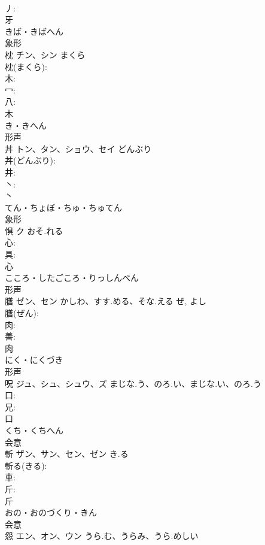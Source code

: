 \documentclass[8pt]{extreport}
\begin{document}
\begin{CJK}{UTF8}{min}
\\	丿: 
\\	牙	
\\	きば・きばへん	
\\	象形 
\\	枕	チン、シン	まくら		
\\	枕(まくら): 
\\	木: 
\\	冖: 
\\	八: 
\\	木	
\\	き・きへん	
\\	形声 
\\	丼	トン、タン、ショウ、セイ	どんぶり		
\\	丼(どんぶり): 
\\	井: 
\\	丶: 
\\	丶	
\\	てん・ちょぼ・ちゅ・ちゅてん	
\\	象形 
\\	惧	ク	おそ.れる		
\\	心: 
\\	具: 
\\	心	
\\	こころ・したごころ・りっしんべん	
\\	形声 
\\	膳	ゼン、セン	かしわ、すす.める、そな.える	ぜ, よし	
\\	膳(ぜん): 
\\	肉: 
\\	善: 
\\	肉	
\\	にく・にくづき	
\\	形声 
\\	呪	ジュ、シュ、シュウ、ズ	まじな.う、のろ.い、まじな.い、のろ.う		
\\	口: 
\\	兄: 
\\	口	
\\	くち・くちへん	
\\	会意 
\\	斬	ザン、サン、セン、ゼン	き.る		
\\	斬る(きる): 
\\	車: 
\\	斤: 
\\	斤	
\\	おの・おのづくり・きん	
\\	会意 
\\	怨	エン、オン、ウン	うら.む、うらみ、うら.めしい		

\end{CJK}
\end{document}
